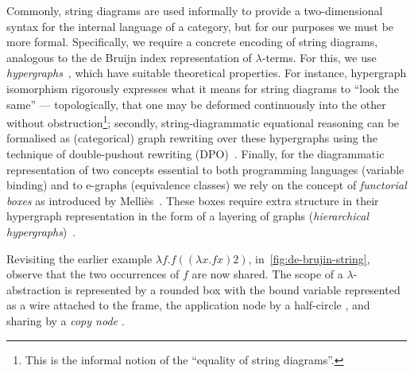 Commonly, string diagrams are used informally to provide a two-dimensional syntax for the internal language of a category, but for our purposes we must be more formal.
Specifically, we require a concrete encoding of string diagrams, analogous to the de Bruijn index representation of $\lambda$-terms.
For this, we use \emph{hypergraphs}~\cite{bonchi_string_2022-1}, which have suitable theoretical properties.
For instance, hypergraph isomorphism rigorously expresses what it means for string diagrams to \enquote{look the same} --- topologically, that one may be deformed continuously into the other without obstruction\footnote{This is the informal notion of the \enquote{equality of string diagrams}.}; secondly, string-diagrammatic equational reasoning can be formalised as (categorical) graph rewriting over these hypergraphs using the technique of double-pushout rewriting (DPO)~\cite{bonchi_string_2022-1}.
Finally, for the diagrammatic representation of two concepts essential to both programming languages (variable binding) and to e-graphs (equivalence classes) we rely on the concept of \emph{functorial boxes} as introduced by Melli\`es~\cite{10.1007/11874683_1}.
These boxes require extra structure in their hypergraph representation in the form of a layering of graphs (\emph{hierarchical hypergraphs})~\cite{fscd}.

Revisiting the earlier example $\lambda f . f ((\lambda x . f x) 2)$, in~\autoref{fig:de-brujin-string}, observe that the two occurrences of $f$ are now shared.
The scope of a $\lambda$-abstraction is represented by a rounded box with the bound variable represented as a wire attached to the frame, the application node by a half-circle
,
and sharing by a \emph{copy node} \comonoid.

